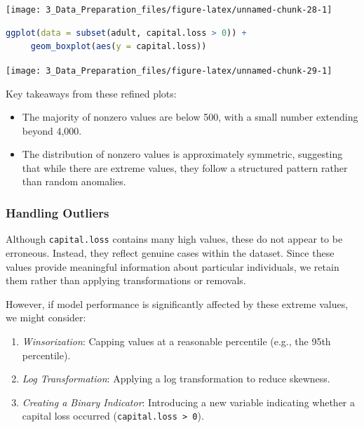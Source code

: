 \documentclass[
  11pt,
]{book}
\newcommand{\passthrough}[1]{#1}
\providecommand{\tightlist}{%
  \setlength{\itemsep}{0pt}\setlength{\parskip}{0pt}}
\theoremstyle{definition}
\theoremstyle{definition}
\theoremstyle{definition}
\theoremstyle{definition}
\theoremstyle{remark}
\begin{document}
\begin{center}\texttt{[image: 3\_Data\_Preparation\_files/figure-latex/unnamed-chunk-28-1]} \end{center}

\begin{lstlisting}[language=R]
ggplot(data = subset(adult, capital.loss > 0)) +
     geom_boxplot(aes(y = capital.loss)) 
\end{lstlisting}

\begin{center}\texttt{[image: 3\_Data\_Preparation\_files/figure-latex/unnamed-chunk-29-1]} \end{center}

Key takeaways from these refined plots:

\begin{itemize}
\tightlist
\item
  The majority of nonzero values are below 500, with a small number extending beyond 4,000.\\
\item
  The distribution of nonzero values is approximately symmetric, suggesting that while there are extreme values, they follow a structured pattern rather than random anomalies.
\end{itemize}

\subsubsection*{Handling Outliers}\label{handling-outliers}


Although \passthrough{\lstinline!capital.loss!} contains many high values, these do not appear to be erroneous. Instead, they reflect genuine cases within the dataset. Since these values provide meaningful information about particular individuals, we retain them rather than applying transformations or removals.

However, if model performance is significantly affected by these extreme values, we might consider:

\begin{enumerate}
\def\labelenumi{\arabic{enumi}.}
\tightlist
\item
  \emph{Winsorization}: Capping values at a reasonable percentile (e.g., the 95th percentile).\\
\item
  \emph{Log Transformation}: Applying a log transformation to reduce skewness.\\
\item
  \emph{Creating a Binary Indicator}: Introducing a new variable indicating whether a capital loss occurred (\passthrough{\lstinline!capital.loss > 0!}).
\end{enumerate}
\end{document}
